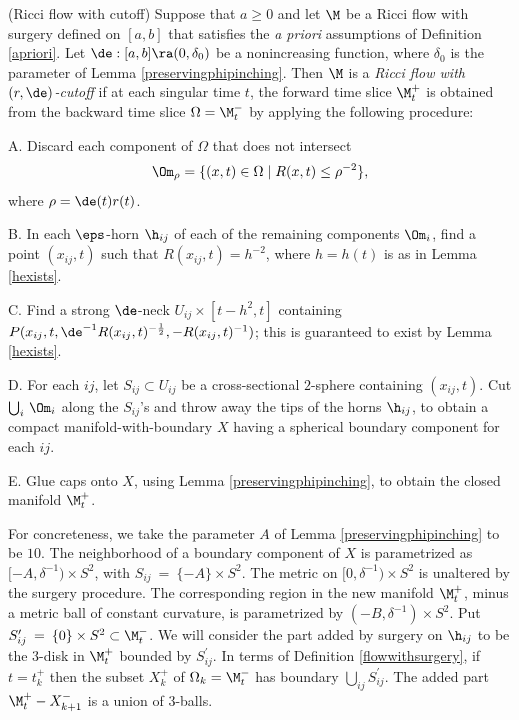 \begin{definition}
  \label{def:kl-performing-surgery-continuing-flows-ricci-flow-cutoff}
(Ricci flow with cutoff)
\label{rdeltacutoffflowdef}
Suppose that $a\geq 0$ and let $\M$ be a Ricci flow with surgery
defined on $[a,b]$ that satisfies the {\it a priori}
assumptions of Definition \ref{apriori}.
Let $\de:[a,b]\ra (0,\delta_0)$ be a nonincreasing function, where
$\delta_0$ is the parameter of Lemma \ref{preservingphipinching}.
Then $\M$ is a
{\em  Ricci flow with $(r, \de)$-cutoff} if
at each singular time $t$, the forward time slice
$\M_{t}^+$ is obtained from the backward time slice $\Omega =
\M_{t}^-$
by applying the following procedure:

A.  Discard each component of $\Omega$ that does not
intersect
\begin{equation}
\Om_{\rho} = \{(x,t)\in \Omega \mid R(x,t)\leq\rho^{-2}\},
\end{equation}
where $\rho= \de(t)r(t)$.

B. In each $\eps$-horn
$\h_{ij}$ of each of the remaining components
$\Om_i$, find a point $(x_{ij},t)$
such that $R(x_{ij},t)=h^{-2}$, where
$h=h(t)$
is as in Lemma \ref{hexists}.

C. Find a strong $\de$-neck $U_{ij}\times [t-h^2,t]$
containing
$P(x_{ij},t,\de^{-1}R(x_{ij},t)^{-\frac12},-R(x_{ij},t)^{-1})$;  this
is guaranteed to exist by Lemma \ref{hexists}.

D.  For each $ij$, let $S_{ij}\subset U_{ij}$ be
a cross-sectional $2$-sphere containing $(x_{ij},t)$.
Cut $\bigcup_i\,\Om_i$
along the $S_{ij}$'s and throw away the tips of the horns
$\h_{ij}$,
to obtain a compact manifold-with-boundary $X$ having a
spherical boundary component for each $ij$.

E. Glue caps onto $X$, using Lemma \ref{preservingphipinching},
to obtain the closed manifold $\M_{t}^+$.
\end{definition}

For concreteness, we take the parameter
$A$ of Lemma \ref{preservingphipinching} to be $10$.
The neighborhood of a boundary
component of $X$ is parametrized as $[-A, \delta^{-1}) \times S^2$,
with $S_{ij} \: = \: \{-A \} \times S^2$.
The metric on $[0, \delta^{-1}) \times S^2$ is unaltered by the surgery procedure.
The corresponding region in the new manifold $\M_{t}^+$, minus
a metric ball of constant curvature, is
parametrized by $(-B, \delta^{-1}) \times S^2$.
Put $S_{ij}^\prime \: = \: \{0\} \times S^2 \subset \M_{t}^-$.
We will consider the part added by surgery on $\h_{ij}$
to be the $3$-disk in $\M_{t}^+$ bounded by $S_{ij}^\prime$.
In terms of Definition \ref{flowwithsurgery}, if $t = t_k^+$ then
the subset $X_k^+$ of $\Omega_k = \M_{t}^-$ has
boundary $\bigcup_{ij} S_{ij}^\prime$. The added part
$\M_{t}^+ - X_{k+1}^-$ is a union of $3$-balls.

